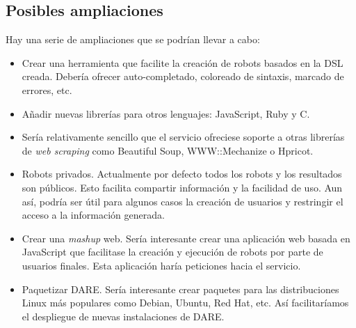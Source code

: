 \subsection{Posibles ampliaciones}

Hay una serie de ampliaciones que se podrían llevar a cabo:

\begin{itemize}
  \item Crear una herramienta que facilite la creación de robots
    basados en la DSL creada. Debería ofrecer auto-completado,
    coloreado de sintaxis, marcado de errores, etc.
  \item Añadir nuevas librerías para otros lenguajes: JavaScript, Ruby
    y C.
  \item Sería relativamente sencillo que el servicio ofreciese soporte
    a otras librerías de \emph{web scraping} como Beautiful
    Soup\cite{SOUP}, WWW::Mechanize\cite{MECHANIZE} o
    Hpricot\cite{HPRICOT}.
  \item Robots privados. Actualmente por defecto todos los robots y
    los resultados son públicos. Esto facilita compartir información y
    la facilidad de uso. Aun así, podría ser útil para algunos casos
    la creación de usuarios y restringir el acceso a la información
    generada.
  \item \label{MASHUP_REF} Crear una \emph{mashup}\cite{MASHUP} web. Sería
    interesante crear una aplicación web basada en JavaScript que
    facilitase la creación y ejecución de robots por parte de usuarios
    finales. Esta aplicación haría peticiones hacia el servicio.
  \item Paquetizar DARE. Sería interesante crear paquetes para las
    distribuciones Linux más populares como Debian, Ubuntu, Red Hat,
    etc. Así facilitaríamos el despliegue de nuevas instalaciones de
    DARE.
\end{itemize}
